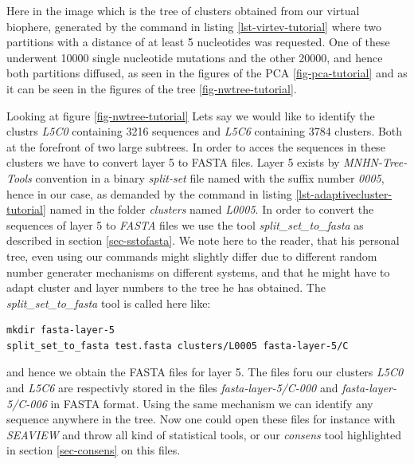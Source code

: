 Here in the image which is the tree of clusters obtained from our
virtual biophere, generated by the command in listing
\ref{lst-virtev-tutorial} where two partitions with a distance of at
least 5 nucleotides was requested. One of these underwent 10000 single
nucleotide mutations and the other 20000, and hence both partitions
diffused, as seen in the figures of the PCA \ref{fig-pca-tutorial} and as it
can be seen in the figures of the tree \ref{fig-nwtree-tutorial}.

Looking at figure \ref{fig-nwtree-tutorial}
Lets say we would like to identify the clustrs \emph{L5C0} containing
3216 sequences and \emph{L5C6} containing 3784 clusters. Both at the
forefront of two large subtrees. In order to acces the sequences in
these clusters we have to convert layer 5 to FASTA files. Layer 5
exists by \emph{MNHN-Tree-Tools} convention in a binary \emph{split-set}
file named with the suffix number \emph{0005}, hence in our case, as
demanded by the command in listing \ref{lst-adaptivecluster-tutorial}
named in the folder \emph{clusters} named \emph{L0005}. In order to
convert the sequences of layer 5 to \emph{FASTA} files we use the
tool \emph{split\_set\_to\_fasta} as described in section
\ref{sec-sstofasta}. We note here to the reader, that his personal tree, even
using our commands might slightly differ due to different random
number generater mechanisms on different systems, and that he might
have to adapt cluster and layer numbers to the tree he has obtained. 
The \emph{split\_set\_to\_fasta} tool is called here like:
\begin{lstlisting}
mkdir fasta-layer-5
split_set_to_fasta test.fasta clusters/L0005 fasta-layer-5/C
\end{lstlisting}
and hence we obtain the FASTA files for layer 5. The files foru our
clusters \emph{L5C0} and \emph{L5C6} are respectivly stored in the
files \emph{fasta-layer-5/C-000} and \emph{fasta-layer-5/C-006} in
FASTA format. Using the same mechanism we can identify any sequence
anywhere in the tree. Now one could open these files for instance with
\emph{SEAVIEW} and throw all kind of statistical tools, or our
\emph{consens} tool highlighted in section \ref{sec-consens} on this
files.

